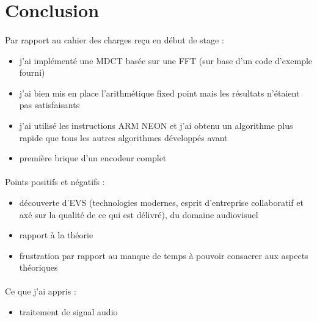 \documentclass{article}
\begin{document}
    \newpage
    \section*{Conclusion}
    \paragraph{}
    Par rapport au cahier des charges reçu en début de stage :
    \begin{itemize}
        \item j'ai implémenté une MDCT basée sur une FFT (sur base d'un code d'exemple fourni)
        \item j'ai bien mis en place l'arithmétique fixed point mais les résultats n'étaient pas satisfaisants
        \item j'ai utilisé les instructions ARM NEON et j'ai obtenu un algorithme plus rapide que tous les autres algorithmes développés avant
        \item première brique d'un encodeur complet
    \end{itemize}

    \paragraph{}
    Points positifs et négatifs :
    \begin{itemize}
        \item découverte d'EVS (technologies modernes, esprit d'entreprise collaboratif et axé sur la qualité de ce qui est délivré), du domaine audiovisuel
        \item rapport à la théorie
        \item frustration par rapport au manque de temps à pouvoir consacrer aux aspects théoriques
    \end{itemize}

    \paragraph{}
    Ce que j'ai appris :
    \begin{itemize}
        \item traitement de signal audio
    \end{itemize}

    \newpage
    
    

    
\end{document}
